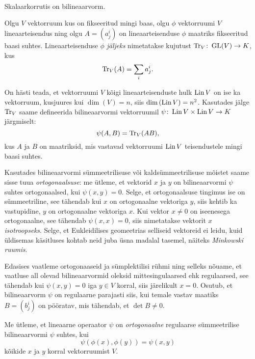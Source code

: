 \begin{naide}
    Skalaarkorrutis on bilineaarvorm.
\end{naide}

\begin{dfn}[Jälg]
    Olgu $V$ vektorruum kus on fikseeritud mingi baas, olgu $\phi$
    vektorruumi $V$ lineaarteisendus ning olgu $A = (a^i_j)$ on
    lineaarteisenduse $\phi$ maatriks fikseeritud baasi suhtes.
    Lineaarteisenduse $\phi$ \emph{jäljeks} nimetatakse kujutust
    $\operatorname{Tr}_V \colon \operatorname{GL}(V) \to K$, kus
    \[ \operatorname{Tr}_V(A) = \sum_i a^i_j. \]
\end{dfn}

\begin{naide}
    On hästi teada, et vektorruumi $V$ kõigi lineaarteisenduste hulk $\operatorname{Lin} V$
    on ise ka vektorruum, kusjuures kui $\dim(V) = n$, siis
    $\dim \left(\operatorname{Lin} V\right) = n^2$. Kasutades jälge $\operatorname{Tr}_V$ saame
    defineerida bilineaarvormi vektorruumil
    $\psi \colon \operatorname{Lin} V \times \operatorname{Lin} V \to K$ järgmiselt:
    \[ \psi(A, B) = \operatorname{Tr}_V(AB), \]
    kus $A$ ja $B$ on maatriksid, mis vastavad vektorruumi $\operatorname{Lin} V$
    teisendustele mingi baasi suhtes.
\end{naide}

Kasutades bilineaarvormi sümmeetrilisuse või kaldsümmeetrilisuse mõistet
saame sisse tuua \emph{ortogonaalsuse}: me ütleme, et vektorid $x$ ja $y$
on bilineaarvormi $\psi$ suhtes ortogonaalsed, kui $\psi(x, y) = 0$. Selge, et
ortogonaalsuse tingimus ise on sümmeetriline, see tähendab kui $x$ on
ortogonaalne vektoriga $y$, siis kehtib ka vastupidine, $y$ on ortogonaalne
vektoriga $x$. Kui vektor $x \neq 0$ on iseenesega ortogonaalne, see tähendab
$\psi(x, x) = 0$, siis nimetatakse vektorit $x$ \emph{isotroopseks}. Selge, et
Eukleidilises geomeetrias selliseid vektoreid ei leidu, kuid üldisemas
käsitluses kohtab neid juba üsna madalal tasemel, näiteks
\emph{Minkowski ruumis}.

Edasises vaatleme ortogonaaseid ja sümplektilisi rühmi ning selleks
nõuame, et vaatluse all olevad bilineaarvormid oleksid mittesingulaarsed
ehk regulaarsed, see tähendab kui $\psi(x, y) = 0$ iga $y \in V$ korral, siis
järelikult $x = 0$. Osutub, et bilineaarvorm $\psi$ on regulaarne parajasti
siis, kui temale vastav maatiks $B = (b^i_j)$ on pööratav, mis tähendab,
et $\det B \neq 0$.

\begin{dfn}
    Me ütleme, et lineaarne operaator $\psi$ on \emph{ortogonaalne}
    regulaarse sümmeetrilise bilineaarvormi $\psi$ suhtes, kui
    \[ \psi(\phi(x), \phi(y)) = \psi(x, y) \]
    kõikide $x$ ja $y$ korral vektorruumist $V$.
\end{dfn}

